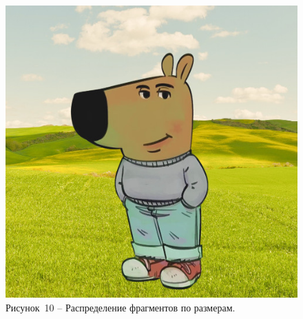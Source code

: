 \begin{figure}[H]
	\centering
	\includegraphics[width=\textwidth]{figures/chill-guy.jpeg}
	\caption*{Рисунок~10 – Распределение фрагментов по размерам.}
	\label{fig:-8}
\end{figure} 